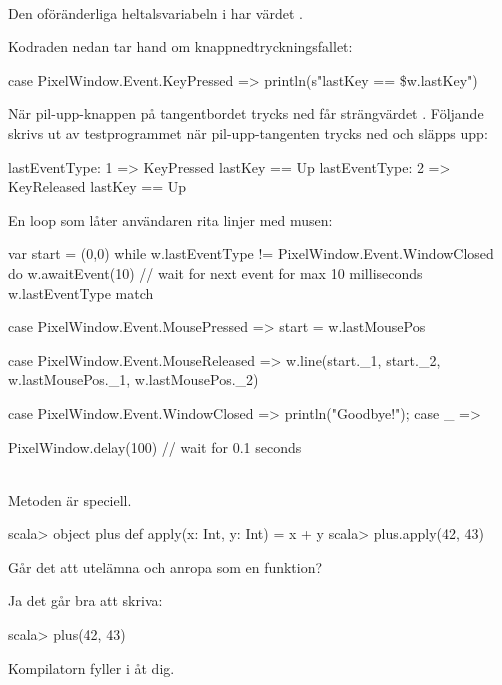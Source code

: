 \TaskSolved \what~

\SubtaskSolved Den oföränderliga heltalsvariabeln  i  har värdet .

\SubtaskSolved Kodraden nedan tar hand om knappnedtryckningsfallet:
\begin{Code}
case PixelWindow.Event.KeyPressed => println(s"lastKey == \$w.lastKey")
\end{Code}

\SubtaskSolved När pil-upp-knappen på tangentbordet trycks ned får  strängvärdet . Följande skrivs ut av testprogrammet när pil-upp-tangenten trycks ned och släpps upp:
\begin{REPL}
lastEventType: 1 => KeyPressed
lastKey == Up
lastEventType: 2 => KeyReleased
lastKey == Up
\end{REPL}


\SubtaskSolved En loop som låter användaren rita linjer med musen:
\begin{Code}
var start = (0,0)
while w.lastEventType != PixelWindow.Event.WindowClosed do
  w.awaitEvent(10)  // wait for next event for max 10 milliseconds
  w.lastEventType match {
    case PixelWindow.Event.MousePressed  =>
      start = w.lastMousePos

    case PixelWindow.Event.MouseReleased =>
      w.line(start._1, start._2, w.lastMousePos._1, w.lastMousePos._2)

    case PixelWindow.Event.WindowClosed  =>
       println("Goodbye!");
    case _ =>
  }
  PixelWindow.delay(100) // wait for 0.1 seconds
\end{Code}

\QUESTEND


\clearpage

\ExtraTasks %


\QUESTBEGIN

\Task  \what~ \\
Metoden  är speciell.
\begin{REPL}
scala> object plus { def apply(x: Int, y: Int) = x + y }
scala> plus.apply(42, 43)
\end{REPL}
Går det att utelämna  och anropa  som en funktion?

\SOLUTION

\TaskSolved \what
Ja det går bra att skriva:
\begin{REPL}
scala> plus(42, 43)
\end{REPL}
Kompilatorn fyller i  åt dig.
\QUESTEND



